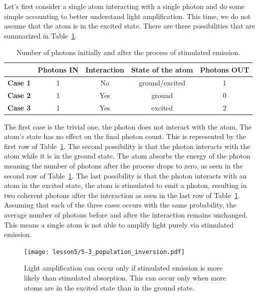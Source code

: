 Let's first consider a single atom interacting with a single photon and do some simple accounting to better understand light amplification.
This time, we do not assume that the atom is in the excited state.
There are three possibilities that are summarized in Table~\ref{tab:5-3_three_possibilities}.
\begin{table}[h]
    \setcellgapes{5pt}
    \renewcommand\theadfont{}
    \makegapedcells
    \centering
    \begin{tabular}{ccccc}
        \hline
        & \textbf{Photons IN} & \textbf{Interaction} & \textbf{State of the atom} & \textbf{Photons OUT} \\
        \hline
        \textbf{Case 1} & 1 & No & ground/excited & 1 \\
        \textbf{Case 2} & 1 & Yes & ground & 0 \\
        \textbf{Case 3} & 1 & Yes & excited & 2 \\
        \hline
    \end{tabular}
    \caption[Stimulated emission accounting.]{Number of photons initially and after the process of stimulated emission.}
    \label{tab:5-3_three_possibilities}
\end{table}
The first case is the trivial one, the photon does not interact with the atom.
The atom's state has no effect on the final photon count.
This is represented by the first row of Table~\ref{tab:5-3_three_possibilities}.
The second possibility is that the photon interacts with the atom while it is in the ground state.
The atom absorbs the energy of the photon meaning the number of photons after the process drops to zero, as seen in the second row of Table~\ref{tab:5-3_three_possibilities}.
The last possibility is that the photon interacts with an atom in the excited state, the atom is stimulated to emit a photon, resulting in two coherent photons after the interaction as seen in the last row of Table~\ref{tab:5-3_three_possibilities}.
Assuming that each of the three cases occurs with the same probability, the average number of photons before and after the interaction remains unchanged.
This means a single atom is not able to amplify light purely via stimulated emission.

\begin{figure}[t]
    \centering
    \texttt{[image: lesson5/5-3\_population\_inversion.pdf]}
    \caption[Population inversion.]{Light amplification can occur only if stimulated emission is more likely than stimulated absorption. This can occur only when more atoms are in the excited state than in the ground state.}
    \label{fig:5-3_population_inversion}
\end{figure}

